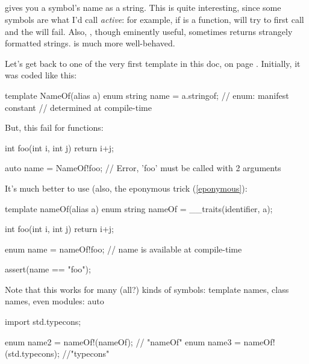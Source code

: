 \subsection{}

 gives you a symbol's name as a string. This is quite interesting, since some symbols are what I'd call \emph{active}: for example, if  is a function,  will try to first call  and the  will fail. Also, , though eminently useful, sometimes returns strangely formatted strings.  is much more well-behaved.

Let's get back to one of the very first template in this doc,  on page \pageref{templatedeclarationexamples}. Initially, it was coded like this:

\begin{dcode}
template NameOf(alias a)
{
    enum string name = a.stringof; // enum: manifest constant
                                   // determined at compile-time
}
\end{dcode}

But, this fail for functions:

\begin{dcode}
int foo(int i, int j) { return i+j;}

auto name = NameOf!foo; // Error, 'foo' must be called with 2 arguments
\end{dcode}

It's much better to use  (also, the eponymous trick (\ref{eponymous}):

\begin{dcode}
template nameOf(alias a)
{
    enum string nameOf = __traits(identifier, a);
}

int foo(int i, int j) { return i+j;}

enum name = nameOf!foo; // name is available at compile-time

assert(name == "foo");
\end{dcode}

Note that this works for many (all?) kinds of symbols: template names, class names, even modules:
auto
\begin{dcode}
import std.typecons;

enum name2 = nameOf!(nameOf); // "nameOf"
enum name3 = nameOf!(std.typecons); //"typecons"
\end{dcode}

\subsection{}

